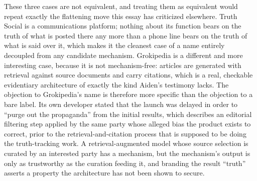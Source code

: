 \documentclass[11pt]{article}
\begin{document}
These three cases are not equivalent, and treating them as equivalent would repeat exactly the flattening move this essay has criticized elsewhere. Truth Social is a communications platform; nothing about its function bears on the truth of what is posted there any more than a phone line bears on the truth of what is said over it, which makes it the cleanest case of a name entirely decoupled from any candidate mechanism. Grokipedia is a different and more interesting case, because it is not mechanism-free: articles are generated with retrieval against source documents and carry citations, which is a real, checkable evidentiary architecture of exactly the kind Aiden's testimony lacks. The objection to Grokipedia's name is therefore more specific than the objection to a bare label. Its own developer stated that the launch was delayed in order to ``purge out the propaganda'' from the initial results, which describes an editorial filtering step applied by the same party whose alleged bias the product exists to correct, prior to the retrieval-and-citation process that is supposed to be doing the truth-tracking work. A retrieval-augmented model whose source selection is curated by an interested party has a mechanism, but the mechanism's output is only as trustworthy as the curation feeding it, and branding the result ``truth'' asserts a property the architecture has not been shown to secure.
\end{document}

